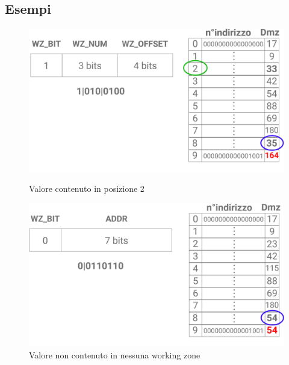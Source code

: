 \documentclass[12pt]{article}
\begin{document}
\subsection{Esempi}
\begin{figure}[!htb]
    \centering
    \begin{minipage}[b]{1\textwidth}
        \includegraphics[scale=0.21]{WZ_IN.png}
        \captionsetup{justification=centering}
        \caption{Valore contenuto in posizione 2}\label{WZ_IN}
    \end{minipage}
    \hfill
    \vspace{0.2cm}
    \begin{minipage}[b]{1\textwidth}
        \includegraphics[scale=0.21]{WZ_OUT.png}
        \captionsetup{justification=centering}
        \caption{Valore non contenuto in nessuna working zone}\label{WZ_OUT}
    \end{minipage}
\end{figure}
\newpage
\end{document}
